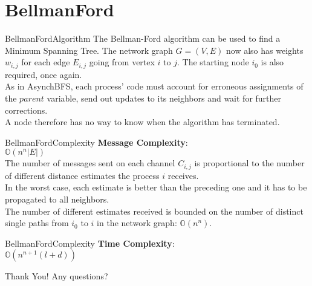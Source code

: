 \documentclass[pdf]{beamer}
\begin{document}
\section{BellmanFord}
\begin{frame}{BellmanFord}{Algorithm}
    \normalsize
	The Bellman-Ford algorithm can be used to find a Minimum Spanning Tree. The network graph $G = (V, E)$ now also has weights $w_{i, j}$ for each edge $E_{i, j}$ going from vertex $i$ to $j$. The starting node $i_0$ is also required, once again. \\
    \vspace{12pt}
    \pause
	As in AsynchBFS, each process' code must account for erroneous assignments of the $parent$ variable, send out updates to its neighbors and wait for further corrections. \\
    \vspace{12pt}
    \pause
    A node therefore has no way to know when the algorithm has terminated. 
\end{frame}

\begin{frame}{BellmanFord}{Complexity}
	\textbf{Message Complexity}: \\
    \vspace{8pt}
    \pause
	$\mathbb{O}(n^n |E|)$ \\
    \vspace{8pt}
    \pause
    \small
    The number of messages sent on each channel $C_{i, j}$ is proportional to the number of different distance estimates the process $i$ receives. \\
    \vspace{8pt}
    \pause
    In the worst case, each estimate is better than the preceding one and it has to be propagated to all neighbors. \\
    \vspace{8pt}
    \pause 
    The number of different estimates received is bounded on the number of distinct single paths from $i_0$ to $i$ in the network graph: $\mathbb{O}(n^n)$.
\end{frame}

\begin{frame}{BellmanFord}{Complexity}
    \normalsize
    \textbf{Time Complexity}: \\
    \vspace{12pt}
    \pause
    $\mathbb{O}(n^{n+1}(l+d))$ \\
\end{frame}

\begin{frame}{Thank You!}
    \large
    Any questions?
\end{frame}
\end{document}
